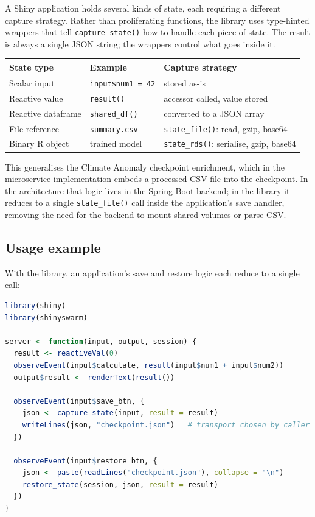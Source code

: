 \documentclass[11pt,a4paper]{article}
\begin{document}
A Shiny application holds several kinds of state, each requiring a different
capture strategy. Rather than proliferating functions, the library uses
type-hinted wrappers that tell \texttt{capture\_state()} how to handle each
piece of state. The result is always a single JSON string; the wrappers control
what goes inside it.

\begin{center}
\begin{tabular}{lll}
\toprule
\textbf{State type} & \textbf{Example} & \textbf{Capture strategy} \\
\midrule
Scalar input        & \texttt{input\$num1 = 42}    & stored as-is \\
Reactive value      & \texttt{result()}             & accessor called, value stored \\
Reactive dataframe  & \texttt{shared\_df()}         & converted to a JSON array \\
File reference       & \texttt{summary.csv}          & \texttt{state\_file()}: read, gzip, base64 \\
Binary R object      & trained model                 & \texttt{state\_rds()}: serialise, gzip, base64 \\
\bottomrule
\end{tabular}
\end{center}

This generalises the Climate Anomaly checkpoint enrichment, which in the
microservice implementation embeds a processed CSV file into the checkpoint. In
the architecture that logic lives in the Spring Boot backend; in the library it
reduces to a single \texttt{state\_file()} call inside the application's save
handler, removing the need for the backend to mount shared volumes or parse CSV.

\subsection{Usage example}

With the library, an application's save and restore logic each reduce to a single
call:

\begin{lstlisting}[language=R]
library(shiny)
library(shinyswarm)

server <- function(input, output, session) {
  result <- reactiveVal(0)
  observeEvent(input$calculate, result(input$num1 + input$num2))
  output$result <- renderText(result())

  observeEvent(input$save_btn, {
    json <- capture_state(input, result = result)
    writeLines(json, "checkpoint.json")   # transport chosen by caller
  })

  observeEvent(input$restore_btn, {
    json <- paste(readLines("checkpoint.json"), collapse = "\n")
    restore_state(session, json, result = result)
  })
}
\end{lstlisting}
\end{document}
